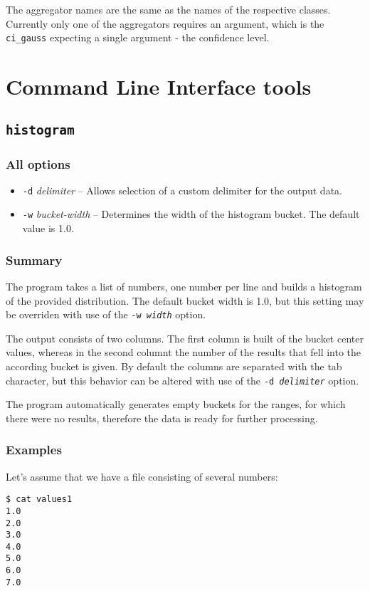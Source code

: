 \documentclass{report}
\begin{document}
The aggregator names are the same as the names of the respective classes. Currently
only one of the aggregators requires an argument, which is the \texttt{ci\_gauss}
expecting a single argument - the confidence level.

\chapter{Command Line Interface tools}

\section{\texttt{histogram}}

\subsection{All options}
\begin{itemize}
	\item \texttt{-d} \textit{delimiter} -- Allows selection of a custom
		delimiter for the output data.
	\item \texttt{-w} \textit{bucket-width} -- Determines the width of the
		histogram bucket. The default value is 1.0.
\end{itemize}

\subsection{Summary}
The program takes a list of numbers, one number per line and builds
a histogram of the provided distribution. The default bucket width is 1.0,
but this setting may be overriden with use of the \texttt{-w \textit{width}}
option.

The output consists of two columns. The first column is built of the bucket
center values, whereas in the second columnt the number of the results that
fell into the according bucket is given. By default the columns are separated
with the tab character, but this behavior can be altered with use of the
\texttt{-d \textit{delimiter}} option.

The program automatically generates empty buckets for the ranges, for which
there were no results, therefore the data is ready for further processing.

\subsection{Examples}
Let's assume that we have a file consisting of several numbers:
\begin{verbatim}
$ cat values1
1.0
2.0
3.0
4.0
5.0
6.0
7.0
\end{verbatim}
\end{document}
